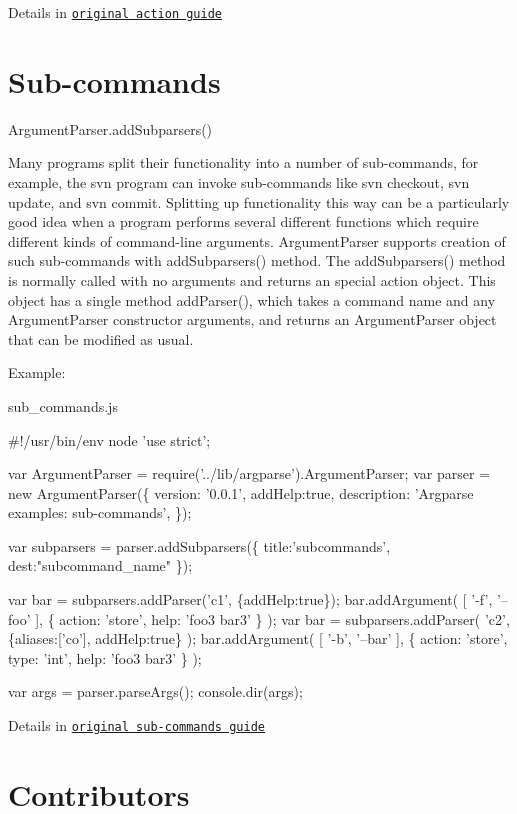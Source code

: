 Details in \href{http://docs.python.org/dev/library/argparse.html#action}{\tt original action guide}

\section*{Sub-\/commands }

Argument\+Parser.\+add\+Subparsers()

Many programs split their functionality into a number of sub-\/commands, for example, the svn program can invoke sub-\/commands like {\ttfamily svn checkout}, {\ttfamily svn update}, and {\ttfamily svn commit}. Splitting up functionality this way can be a particularly good idea when a program performs several different functions which require different kinds of command-\/line arguments. {\ttfamily Argument\+Parser} supports creation of such sub-\/commands with {\ttfamily add\+Subparsers()} method. The {\ttfamily add\+Subparsers()} method is normally called with no arguments and returns an special action object. This object has a single method {\ttfamily add\+Parser()}, which takes a command name and any {\ttfamily Argument\+Parser} constructor arguments, and returns an {\ttfamily Argument\+Parser} object that can be modified as usual.

Example\+:

sub\+\_\+commands.\+js 
\begin{DoxyCode}
#!/usr/bin/env node
'use strict';

var ArgumentParser = require('../lib/argparse').ArgumentParser;
var parser = new ArgumentParser(\{
  version: '0.0.1',
  addHelp:true,
  description: 'Argparse examples: sub-commands',
\});

var subparsers = parser.addSubparsers(\{
  title:'subcommands',
  dest:"subcommand\_name"
\});

var bar = subparsers.addParser('c1', \{addHelp:true\});
bar.addArgument(
  [ '-f', '--foo' ],
  \{
    action: 'store',
    help: 'foo3 bar3'
  \}
);
var bar = subparsers.addParser(
  'c2',
  \{aliases:['co'], addHelp:true\}
);
bar.addArgument(
  [ '-b', '--bar' ],
  \{
    action: 'store',
    type: 'int',
    help: 'foo3 bar3'
  \}
);

var args = parser.parseArgs();
console.dir(args);
\end{DoxyCode}


Details in \href{http://docs.python.org/dev/library/argparse.html#sub-commands}{\tt original sub-\/commands guide}

\section*{Contributors }


